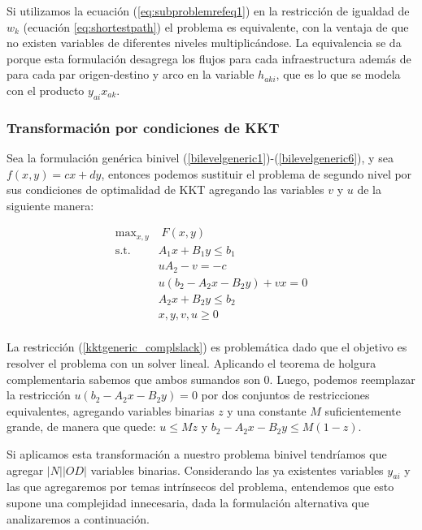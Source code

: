 \documentclass{article}
\begin{document}
  Si utilizamos la ecuación (\ref{eq:subproblemrefeq1}) en la restricción de igualdad de $w_k$ (ecuación \ref{eq:shortestpath}) el problema es equivalente, con la ventaja de que no existen variables de diferentes niveles multiplicándose. La equivalencia se da porque esta formulación desagrega los flujos para cada infraestructura además de para cada par origen-destino y arco en la variable $h_{aki}$, que es lo que se modela con el producto $y_{ai} x_{ak}$.

  \subsubsection{Transformación por condiciones de KKT}

  Sea la formulación genérica binivel (\ref{bilevelgeneric1})-(\ref{bilevelgeneric6}), y sea $f(x, y) = cx + dy$, entonces podemos sustituir el problema de segundo nivel por sus condiciones de optimalidad de KKT agregando las variables $v$ y $u$ de la siguiente manera:

  \begin{align}
    \text{max}_{x,y}        & \; F(x, y) \label{kktgeneric1} \\
    \text{s.t.}             & A_1 x + B_1 y \leq b_1 \\
                            & uA_2 - v = -c \\
                            & u(b_2 - A_2x - B_2y) + vx = 0 \label{kktgeneric_complslack} \\
                            & A_2 x + B_2 y \leq b_2 \label{kktgeneric5} \\
                            & x, y, v, u \geq 0 \label{kktgeneric6} \\
  \end{align}

  La restricción (\ref{kktgeneric_complslack}) es problemática dado que el objetivo es resolver el problema con un solver lineal. Aplicando el teorema de holgura complementaria sabemos que ambos sumandos son 0. Luego, podemos reemplazar la restricción $u(b_2 - A_2x - B_2y) = 0$ por dos conjuntos de restricciones equivalentes, agregando variables binarias $z$ y una constante $M$ suficientemente grande, de manera que quede: $u \leq Mz$ y $b_2 - A_2x - B_2y \leq M(1-z)$.

  Si aplicamos esta transformación a nuestro problema binivel tendríamos que agregar $|N| |OD|$ variables binarias. Considerando las ya existentes variables $y_{ai}$ y las que agregaremos por temas intrínsecos del problema, entendemos que esto supone una complejidad innecesaria, dada la formulación alternativa que analizaremos a continuación.
\end{document}
